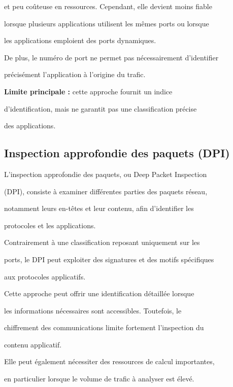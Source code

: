 et peu coûteuse en ressources. Cependant, elle devient moins fiable

lorsque plusieurs applications utilisent les mêmes ports ou lorsque

les applications emploient des ports dynamiques.



De plus, le numéro de port ne permet pas nécessairement d'identifier

précisément l'application à l'origine du trafic.



\textbf{Limite principale :} cette approche fournit un indice

d'identification, mais ne garantit pas une classification précise

des applications.



\subsection{Inspection approfondie des paquets (DPI)}



L'inspection approfondie des paquets, ou Deep Packet Inspection

(DPI), consiste à examiner différentes parties des paquets réseau,

notamment leurs en-têtes et leur contenu, afin d'identifier les

protocoles et les applications.



Contrairement à une classification reposant uniquement sur les

ports, le DPI peut exploiter des signatures et des motifs spécifiques

aux protocoles applicatifs.



Cette approche peut offrir une identification détaillée lorsque

les informations nécessaires sont accessibles. Toutefois, le

chiffrement des communications limite fortement l'inspection du

contenu applicatif.



Elle peut également nécessiter des ressources de calcul importantes,

en particulier lorsque le volume de trafic à analyser est élevé.



